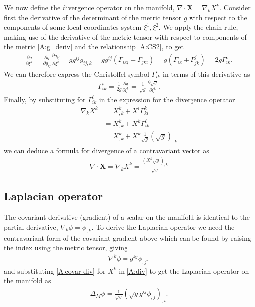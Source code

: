 We now define the divergence operator on the manifold,
$\nabla\cdot \mathbf{X} = \nabla_k X^k$. Consider first the derivative of the 
determinant of the metric tensor $g$ with respect to 
the components of some local coordinates system $\xi^1,\xi^2$. We apply the 
chain rule, making use of the derivative of the metric tensor with respect to 
components of the metric \eqref{A:g_deriv} and the relationship \eqref{A:CS2}, 
to get
\begin{align}
    \frac{\partial g}{\partial \xi^k} = \frac{\partial g}{\partial g_{ij}}\frac{\partial g_{ij}}{\partial \xi^k} = 
    gg^{ij}g_{ij,k} = gg^{ij}(\Gamma_{ikj} + \Gamma_{jki}) = g(\Gamma_{ik}^i + \Gamma_{jk}^j) = 2g\Gamma_{ik}^i.
    \label{A:g_deriv2}
\end{align}
We can therefore express the Christoffel symbol $\Gamma_{ik}^i$ in terms of this
derivative as
\begin{align}
    \Gamma_{ik}^i = \frac{1}{2g}\frac{\partial g}{\partial \xi^k} = \frac{1}{\sqrt{g}}\frac{\partial\sqrt{g}}{\partial \xi^k}.
    \label{A:G_ik^i}
\end{align}
Finally, by substituting for $\Gamma_{ik}^i$ in the expression for the 
divergence operator
\begin{align*}
 \nabla_k X^k &= X^k_{,k} + X^i\Gamma_{ki}^k \\ 
              &= X^k_{,k} + X^k\Gamma_{ik}^i \\
              &= X^k_{,k} + X^k\frac{1}{\sqrt{g}}(\sqrt{g})_{,k}
\end{align*}
we can deduce a formula for divergence of a contravariant vector as
\begin{align}
\nabla\cdot \mathbf{X} = \nabla_k X^k = \frac{\left(X^k\sqrt{g}\right)_{,k}}{\sqrt{g}}
\label{A:div}
\end{align}


\subsection{Laplacian operator} 
The covariant derivative (gradient) of a scalar on the manifold is identical to
the partial derivative, $\nabla_k \phi = \phi_{,k}$.
To derive the Laplacian operator we need the contravariant form of the covariant
gradient above which can be found by raising the index using the metric tensor,
giving
\begin{align}
    \nabla^k \phi = g^{kj}\phi_{,j},
    \label{A:covar-div}
\end{align}
and substituting \eqref{A:covar-div} for $X^k$ in \eqref{A:div} to get the Laplacian operator
on the manifold as
\begin{align}
    \Delta_M\phi = \frac{1}{\sqrt{g}}\left(\sqrt{g}g^{ij}\phi_{,j}\right)_{,i}.
    \label{A:surf_lapl}
\end{align}


